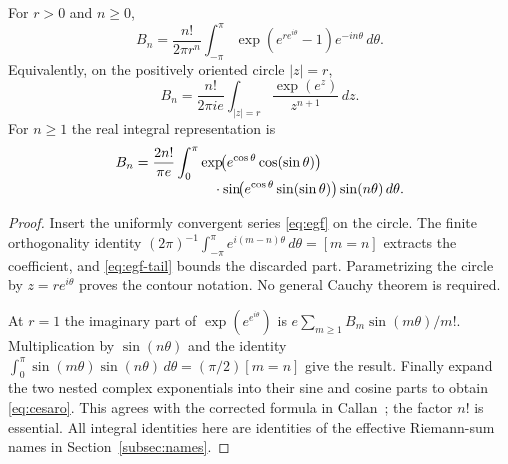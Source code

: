 \begin{theorem}\label{thm:fourier-coefficient}
For $r>0$ and $n\ge0$,
\begin{equation}\label{eq:circular-extraction}
 B_n=\frac{n!}{2\pi r^n}
  \int_{-\pi}^{\pi}\exp(e^{r e^{i\theta}}-1)e^{-in\theta}\,d\theta.
\end{equation}
Equivalently, on the positively oriented circle $|z|=r$,
\[
 B_n=\frac{n!}{2\pi i e}\int_{|z|=r}
                    \frac{\exp(e^z)}{z^{n+1}}\,dz.
\]
For $n\ge1$ the real integral representation is
\begin{align}\label{eq:cesaro}
 B_n=\frac{2n!}{\pi e}\int_0^\pi
  &\exp\!\bigl(e^{\cos\theta}\cos(\sin\theta)\bigr)\notag\\[-3pt]
  &\quad\cdot\sin\!\bigl(e^{\cos\theta}\sin(\sin\theta)\bigr)
    \sin(n\theta)\,d\theta.
\end{align}
\end{theorem}
\begin{proof}
Insert the uniformly convergent series \eqref{eq:egf} on the circle.  The
finite orthogonality identity
$(2\pi)^{-1}\int_{-\pi}^{\pi}e^{i(m-n)\theta}\,d\theta=[m=n]$
extracts the coefficient, and \eqref{eq:egf-tail} bounds the discarded part.
Parametrizing the circle by $z=r e^{i\theta}$ proves the contour notation.
No general Cauchy theorem is required.

At $r=1$ the imaginary part of $\exp(e^{e^{i\theta}})$ is
$e\sum_{m\ge1}B_m\sin(m\theta)/m!$.  Multiplication by $\sin(n\theta)$
and the identity
$\int_0^\pi\sin(m\theta)\sin(n\theta)\,d\theta=(\pi/2)[m=n]$
give the result.  Finally expand the two nested complex exponentials into
their sine and cosine parts to obtain \eqref{eq:cesaro}.  This agrees with
the corrected formula in Callan~\cite{callan-cesaro}; the factor $n!$ is essential.
All integral identities here are identities of the effective Riemann-sum
names in Section~\ref{subsec:names}.
\end{proof}
